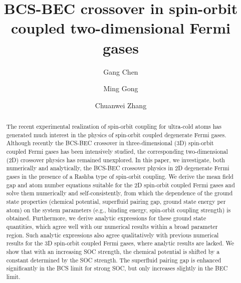 \documentclass[pra,print,showpacs,superscriptaddress,twocolumn]{revtex4}
\begin{document}
\title{BCS-BEC crossover in spin-orbit coupled two-dimensional Fermi gases}
\author{Gang Chen}
\author{Ming Gong}
\author{Chuanwei Zhang}

\begin{abstract}
The recent experimental realization of spin-orbit coupling for ultra-cold
atoms has generated much interest in the physics of spin-orbit coupled
degenerate Fermi gases. Although recently the BCS-BEC crossover in
three-dimensional (3D) spin-orbit coupled Fermi gases has been intensively
studied, the corresponding two-dimensional (2D) crossover physics has
remained unexplored. In this paper, we investigate, both numerically and
analytically, the BCS-BEC crossover physics in 2D degenerate Fermi gases in
the presence of a Rashba type of spin-orbit coupling. We derive the mean
field gap and atom number equations suitable for the 2D spin-orbit coupled
Fermi gases and solve them numerically and self-consistently, from which the
dependence of the ground state properties (chemical potential, superfluid
pairing gap, ground state energy per atom) on the system parameters (e.g.,
binding energy, spin-orbit coupling strength) is obtained. Furthermore, we
derive analytic expressions for these ground state quantities, which agree
well with our numerical results within a broad parameter region. Such
analytic expressions also agree qualitatively with previous numerical
results for the 3D spin-orbit coupled Fermi gases, where analytic results
are lacked. We show that with an increasing SOC strength, the chemical
potential is shifted by a constant determined by the SOC strength. The
superfluid pairing gap is enhanced significantly in the BCS limit for strong
SOC, but only increases slightly in the BEC limit.
\end{abstract}

\maketitle
\end{document}
